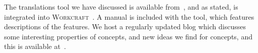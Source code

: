 \documentclass[british,conference,compsoc]{IEEEtran}
\newcommand{\noun}[1]{\textsc{#1}}
\begin{document}
The translations tool we have discussed is available 
from~\cite{2016_concepts_github}, and as stated, is integrated into 
\noun{Workcraft}~\cite{Workcraft_website}. A manual is included with the tool, 
which features descriptions of the features. We host a regularly updated blog 
which discusses some interesting properties of concepts, and new ideas we find 
for concepts, and this is available  at~\cite{2016_blog_concepts}.




\end{document}
